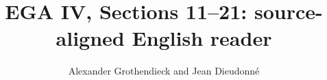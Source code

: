 
\setlength{\emergencystretch}{3em}



\title{EGA IV, Sections 11--21: source-aligned English reader}
\author{Alexander Grothendieck and Jean Dieudonn\'e}
\date{}
\maketitle
\tableofcontents














